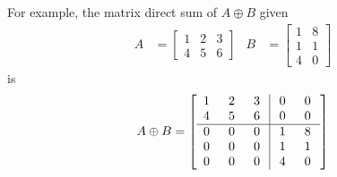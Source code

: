For example, the matrix direct sum of $A \oplus B$ given
\begin{align*}
A &= 
\begin{bmatrix}
1 & 2 & 3 \\
4 & 5 & 6
\end{bmatrix}
& 
B &=
\begin{bmatrix}
1 & 8 \\
1 & 1 \\
4 & 0
\end{bmatrix}
\end{align*}
is
\begin{align*}
A \oplus B =
\left[\begin{array}{@{\;}wc{10pt}wc{10pt}wc{10pt}|wc{10pt}wc{10pt}}
1 & 2 & 3 & 0 & 0 \\
4 & 5 & 6 & 0 & 0 \\
\hline
0 & 0 & 0 & 1 & 8 \\
0 & 0 & 0 & 1 & 1 \\
0 & 0 & 0 & 4 & 0
\end{array}\right]
\end{align*}
